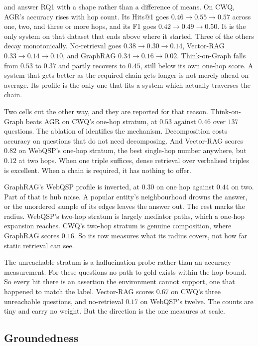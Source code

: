  and  answer RQ1 with a shape rather than a
difference of means. On CWQ, AGR's accuracy rises with hop count. Its Hits@1
goes $0.46 \to 0.55 \to 0.57$ across one, two, and three or more hops, and its
F1 goes $0.42 \to 0.49 \to 0.50$. It is the only system on that dataset that
ends above where it started. Three of the others decay monotonically.
No-retrieval goes $0.38 \to 0.30 \to 0.14$, Vector-RAG $0.33 \to 0.14 \to 0.10$,
and GraphRAG $0.34 \to 0.16 \to 0.02$. Think-on-Graph falls from $0.53$ to
$0.37$ and partly recovers to $0.45$, still below its own one-hop score. A
system that gets better as the required chain gets longer is not merely ahead on
average. Its profile is the only one that fits a system which actually traverses
the chain.

Two cells cut the other way, and they are reported for that reason.
Think-on-Graph beats AGR on CWQ's one-hop stratum, at $0.53$ against $0.46$ over
$137$ questions. The ablation of  identifies the mechanism.
Decomposition costs accuracy on questions that do not need decomposing. And
Vector-RAG scores $0.82$ on WebQSP's one-hop stratum, the best single-hop number
anywhere, but $0.12$ at two hops. When one triple suffices, dense retrieval over
verbalised triples is excellent. When a chain is required, it has nothing to
offer.

GraphRAG's WebQSP profile is inverted, at $0.30$ on one hop against $0.44$ on
two. Part of that is hub noise. A popular entity's neighbourhood drowns the
answer, or the unordered sample of its edges leaves the answer out. The rest
marks the radius. WebQSP's two-hop stratum is largely mediator paths, which a
one-hop expansion reaches. CWQ's two-hop stratum is genuine composition, where
GraphRAG scores $0.16$. So its row measures what its radius covers, not how far
static retrieval can see.

The unreachable stratum is a hallucination probe rather than an accuracy
measurement. For these questions no path to gold exists within the hop bound. So
every hit there is an assertion the environment cannot support, one that
happened to match the label. Vector-RAG scores $0.67$ on CWQ's three unreachable
questions, and no-retrieval $0.17$ on WebQSP's twelve. The counts are tiny and
carry no weight. But the direction is the one  measures
at scale.

\subsection{Groundedness}\label{sec:groundedness}

